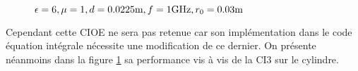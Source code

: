 \begin{figure}[!hbt]
          \caption[CIOE sur empilement de Hoppe & Rahmat-Samii p.~62]{\(\epsilon = 6, \mu = 1, d=0.0225\text{m}, f=1\text{GHz}, r_0=0.03\text{m}\)}
          \label{fig:imp_fourier:plan:hoppe:62:hoibc:ibc6}
      \end{figure}

      Cependant cette CIOE ne sera pas retenue car son implémentation dans le code équation intégrale nécessite une modification de ce dernier. On présente néanmoins dans la figure \ref{fig:imp_fourier:plan:hoppe:62:hoibc:ibc6} sa performance vis à vis de la CI3 sur le cylindre.